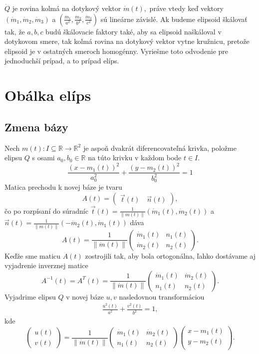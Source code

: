 $ \dot{Q}$ je rovina kolmá na dotykový vektor $\dot{m}(t), $ práve vtedy keď vektory $(\dot{m}_1, \dot{m}_2, \dot{m}_3) $ a $(\frac{\dot{m}_1}{a^2}, \frac{\dot{m}_2}{b^2}, \frac{\dot{m}_3}{c^2}) $ sú lineárne závislé. Ak budeme elipsoid škálovať tak, že $a, b, c$ budú škálovacie faktory také, aby sa elipsoid naškáloval v dotykovom smere, tak kolmá rovina na dotykový vektor vytne kružnicu, pretože elipsoid je v ostatných smeroch homogénny. Vyriešme toto odvodenie pre jednoduchší prípad, a to prípad elíps.

\section{Obálka elíps}
\subsection{Zmena bázy}
Nech $m(t) \colon  I \subseteq \mathbb{R} \rightarrow \mathbb{R}^2$ je aspoň dvakrát diferencovateľná krivka, položme elipsu $Q$ s osami $a_0, b_0 \in \mathbb{R}$ na túto krivku v každom bode $t \in I.$
\begin{equation*}
\frac{{(x - m_1(t))^2}}{a_0^2} + \frac{{(y - m_2(t))^2}}{b_0^2} = 1
\end{equation*}
Matica prechodu k novej báze je tvaru
$$
A(t) = \left(\begin{matrix} \vec{t}(t) \quad \vec{n}(t)
\end{matrix} \right),
$$
čo po rozpísaní do súradníc $\vec{t}(t) = \frac{1}{ \| \dot{m}(t) \|}( \dot{m}_1(t),  \dot{m}_2(t))$ a $\vec{n}(t) = \frac{1}{ \| \dot{m}(t) \|}( -\dot{m}_2(t),  \dot{m}_1(t))$ dáva 
$$
A(t) = \frac{1}{ \| \dot{m}(t) \|} \left(\begin{matrix}
   \dot{m}_1(t) & n_1(t) \\
   \dot{m}_2(t) & n_2(t)
\end{matrix} \right).
$$
Keďže sme maticu $A(t)$ zostrojili tak, aby bola ortogonálna, ľahko dostávame aj vyjadrenie inverznej matice
$$
A^{-1}(t) = A^{T}(t) = \frac{1}{ \| \dot{m}(t) \|} \left(\begin{matrix}
  \dot{m}_1(t) & \dot{m}_2(t) \\
    n_1(t) & n_2(t)
\end{matrix}\right).
$$
Vyjadrime elipsu $Q$ v novej báze $ u, v$ nasledovnou transformáciou
\begin{align*}
\frac{u^2(t)}{a^2} + \frac{v^2(t)}{b^2} = 1,
\end{align*}
kde 
$$
\left(\begin{matrix}
u(t) \\
v(t)
\end{matrix}\right) = \frac{1}{ \| \dot{m}(t) \|}
\left(\begin{matrix}
  \dot{m}_1(t) & \dot{m}_2(t) \\
    n_1(t) & n_2(t)
\end{matrix}\right)
\left(\begin{matrix}
x-m_1(t) \\
y-m_2(t) \\
\end{matrix}\right).
$$
